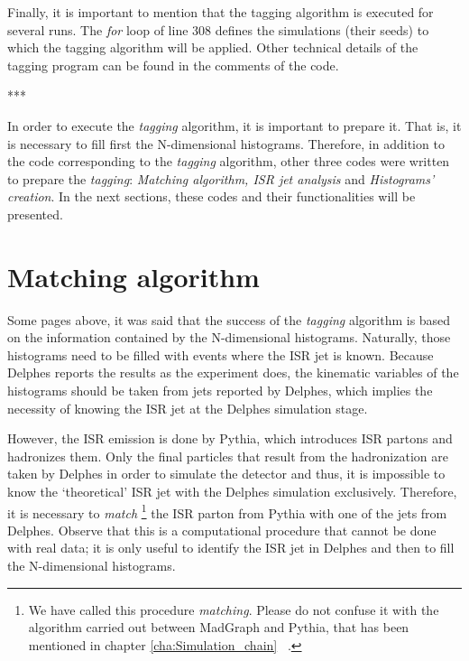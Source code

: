 \documentclass[12pt, oneside]{book}              %
\begin{document}
Finally, it is important to mention that the tagging algorithm is executed for
several runs. The \textit{for} loop of line 308 defines the simulations (their seeds) 
to which the tagging algorithm will be applied. Other technical details of the tagging
program can be found in the comments of the code.

\begin{center}
	***
\end{center}

In order to execute the \textit{tagging} algorithm, it is important to prepare
it. That is, it is necessary to fill first the N-dimensional histograms. Therefore,
in addition to the code corresponding to the \textit{tagging} algorithm, other
three codes were written to prepare the \textit{tagging}: \textit{Matching algorithm,
ISR jet analysis} and \textit{Histograms' creation}. In the next sections,
these codes and their functionalities will be presented.

\section{Matching algorithm}\label{sec:Matching}

Some pages above, it was said that the success of the \textit{tagging} algorithm
is based on the information contained by the N-dimensional histograms.
Naturally, those histograms need to be filled with events
where the ISR jet is known. Because Delphes reports the results as the 
experiment does, the kinematic variables of the histograms should be taken
from jets reported by Delphes, which implies the necessity of knowing the ISR
jet at the Delphes simulation stage.

However, the ISR emission is done by Pythia, which introduces ISR partons and
hadronizes them. Only the final particles that result from the hadronization are 
taken by Delphes in order to simulate the detector and thus, it is impossible 
to know the \textquoteleft theoretical' ISR jet with the Delphes simulation exclusively. 
Therefore, it is necessary to \textit{match} \footnote{We have called this procedure 
\textit{matching}. Please do not confuse it with the algorithm carried out
between MadGraph and Pythia, that has been mentioned in chapter \ref{cha:Simulation_chain} ~\cite{matching}.} the ISR parton from Pythia with 
one of the jets from Delphes. Observe that this is a computational procedure 
that cannot be done with real data; it is only useful to identify the ISR jet 
in Delphes and then to fill the N-dimensional histograms.
\end{document}
